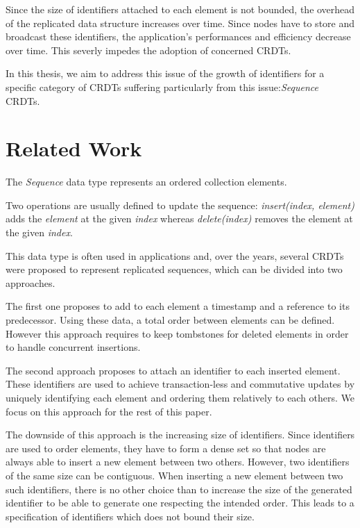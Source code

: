 \documentclass[sigplan]{acmart}
\begin{document}
Since the size of identifiers attached to each element is not bounded, the overhead of the replicated data structure increases over time.
Since nodes have to store and broadcast these identifiers, the application's performances and efficiency decrease over time.
This severly impedes the adoption of concerned \acp{CRDT}.

In this thesis, we aim to address this issue of the growth of identifiers for a specific category of \acp{CRDT} suffering particularly from this issue:\emph{Sequence} \acp{CRDT}.

\section{Related Work}

The \emph{Sequence} data type represents an ordered collection elements.

Two operations are usually defined to update the sequence:
\emph{insert(index, element)} adds the \emph{element} at the given \emph{index}
whereas \emph{delete(index)} removes the element at the given \emph{index}.

This data type is often used in applications and, over the years, several \acp{CRDT} \cite{shapiro:inria-00177693, WeissICDCS09, AndreCollaborateCom2013} were proposed to represent replicated sequences, which can be divided into two approaches.

The first one proposes to add to each element a timestamp and a reference to its predecessor.
Using these data, a total order between elements can be defined.
However this approach requires to keep tombstones for deleted elements in order to handle concurrent insertions.

The second approach proposes to attach an identifier to each inserted element.
These identifiers are used to achieve transaction-less and commutative updates by uniquely identifying each element and ordering them relatively to each others.
We focus on this approach for the rest of this paper.

The downside of this approach is the increasing size of identifiers.
Since identifiers are used to order elements, they have to form a dense set so that nodes are always able to insert a new element between two others.
However, two identifiers of the same size can be contiguous.
When inserting a new element between two such identifiers, there is no other choice than to increase the size of the generated identifier to be able to generate one respecting the intended order. This leads to a specification of identifiers which does not bound their size.
\end{document}
